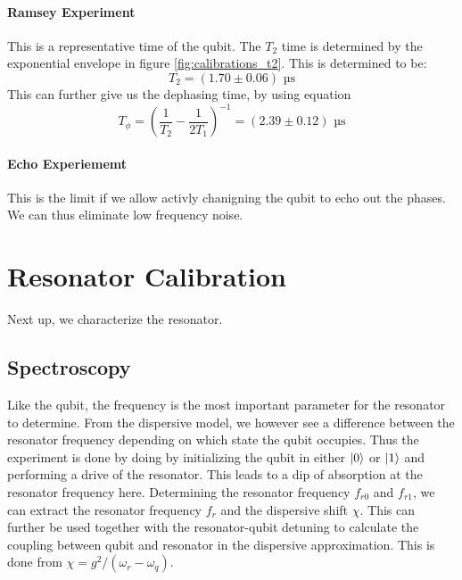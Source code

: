 \paragraph{Ramsey Experiment}
This is a representative time of the qubit.
The $T_2$ time is determined by the exponential envelope in figure \ref{fig:calibrations_t2}. This is determined to be:
\begin{equation}
    T_2 = (1.70 \pm 0.06) \text{ µs} 
\end{equation}
This can further give us the dephasing time, by using equation 
\begin{equation}
    T_\phi = \left(\frac{1}{T_2} - \frac{1}{2T_1} \right)^{-1} = (2.39 \pm 0.12) \text{ µs}
\end{equation}

\paragraph{Echo Experiememt}
This is the limit if we allow activly chanigning the qubit to echo out the phases. We can thus eliminate low frequency noise.




\section{Resonator Calibration}
Next up, we characterize the resonator.

\subsection{Spectroscopy}
 Like the qubit, the frequency is the most important parameter for the resonator to determine. From the dispersive model, we however see a difference between the resonator frequency depending on which state the qubit occupies. Thus the experiment is done by doing by initializing the qubit in either $\ket{0}$ or $\ket{1}$ and performing a drive of the resonator. This leads to a dip of absorption at the resonator frequency here. Determining the resonator frequency $f_{r0}$ and $f_{r1}$, we can extract the resonator frequency $f_r$ and the dispersive shift $\chi$. This can further be used together with the resonator-qubit detuning to calculate the coupling between qubit and resonator in the dispersive approximation. This is done from $\chi = g^2 / (\omega_r - \omega_q)$.


